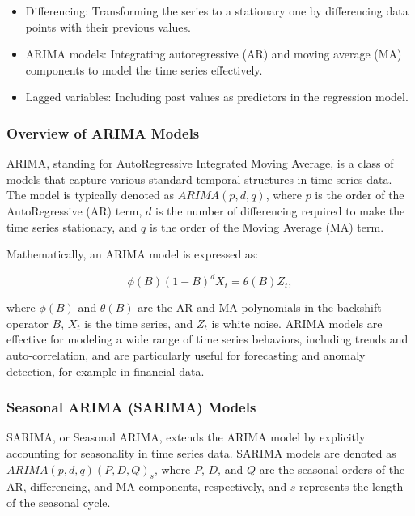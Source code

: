 \documentclass[12pt, twoside,hidelinks]{article}
\theoremstyle{definition}
\numberwithin{equation}{section}
\begin{document}
\begin{itemize}
  \item Differencing: Transforming the series to a stationary one by differencing data points with their previous values.
  \item ARIMA models: Integrating autoregressive (AR) and moving average (MA) components to model the time series effectively.
  \item Lagged variables: Including past values as predictors in the regression model.
\end{itemize}


\subsubsection*{Overview of ARIMA Models}

ARIMA, standing for AutoRegressive Integrated Moving Average, is a class of models that capture various standard temporal structures in time series data. The model is typically denoted as \(ARIMA(p, d, q)\), where \(p\) is the order of the AutoRegressive (AR) term, \(d\) is the number of differencing required to make the time series stationary, and \(q\) is the order of the Moving Average (MA) term.

Mathematically, an ARIMA model is expressed as:

\begin{equation}
    \phi(B)(1-B)^d X_t = \theta(B)Z_t,
    \label{eq:arima}
\end{equation}

where \( \phi(B) \) and \( \theta(B) \) are the AR and MA polynomials in the backshift operator \( B \), \( X_t \) is the time series, and \( Z_t \) is white noise. ARIMA models are effective for modeling a wide range of time series behaviors, including trends and auto-correlation, and are particularly useful for forecasting and anomaly detection, for example in financial data.

\subsubsection*{Seasonal ARIMA (SARIMA) Models}

SARIMA, or Seasonal ARIMA, extends the ARIMA model by explicitly accounting for seasonality in time series data. SARIMA models are denoted as \(ARIMA(p,d,q)(P,D,Q)_s\), where \(P\), \(D\), and \(Q\) are the seasonal orders of the AR, differencing, and MA components, respectively, and \(s\) represents the length of the seasonal cycle.
\end{document}
